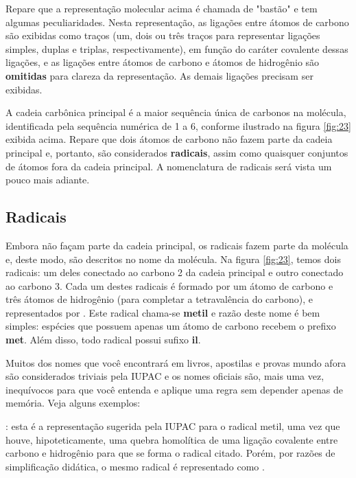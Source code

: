 Repare que a representação molecular acima é chamada de "bastão" e tem algumas peculiaridades. Nesta representação, as ligações entre átomos de carbono são exibidas como traços (um, dois ou três traços para representar ligações simples, duplas e triplas, respectivamente), em função do caráter covalente dessas ligações, e as ligações entre átomos de carbono e átomos de hidrogênio são \textbf{omitidas} para clareza da representação. As demais ligações precisam ser exibidas.

A cadeia carbônica principal é a maior sequência única de carbonos na molécula, identificada pela sequência numérica de 1 a 6, conforme ilustrado na figura \ref{fig:23} exibida acima. Repare que dois átomos de carbono não fazem parte da cadeia principal e, portanto, são considerados \textbf{radicais}, assim como quaisquer conjuntos de átomos fora da cadeia principal. A nomenclatura de radicais será vista um pouco mais adiante.

\subsection{Radicais}
	
Embora não façam parte da cadeia principal, os radicais fazem parte da molécula e, deste modo, são descritos no nome da molécula. Na figura \ref{fig:23}, temos dois radicais: um deles conectado ao carbono 2 da cadeia principal e outro conectado ao carbono 3. Cada um destes radicais é formado por um átomo de carbono e três átomos de hidrogênio (para completar a tetravalência do carbono), e representados por \textbf{}. Este radical chama-se \textbf{metil} e razão deste nome é bem simples: espécies que possuem apenas um átomo de carbono recebem o prefixo \textbf{met}. Além disso, todo radical possui sufixo \textbf{il}.

Muitos dos nomes que você encontrará em livros, apostilas e provas mundo afora são considerados triviais pela IUPAC e os nomes oficiais são, mais uma vez, inequívocos para que você entenda e aplique uma regra sem depender apenas de memória. Veja alguns exemplos:

\textbf{} : esta é a representação sugerida pela IUPAC para o radical metil, uma vez que houve, hipoteticamente, uma quebra homolítica de uma ligação covalente entre carbono e hidrogênio para que se forma o radical citado. Porém, por razões de simplificação didática, o mesmo radical é representado como .

